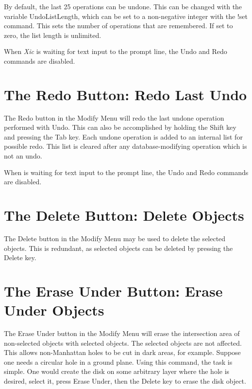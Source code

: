 By default, the last 25 operations can be undone.  This can be changed
with the variable {\et UndoListLength}, which can be set to a
non-negative integer with the {\cb !set} command.  This sets the
number of operations that are remembered.  If set to zero, the list
length is unlimited.

When {\it Xic} is waiting for text input to the prompt line, the {\cb
Undo} and {\cb Redo} commands are disabled.


\section{The {\cb Redo} Button: Redo Last Undo}
The {\cb Redo} button in the {\cb Modify Menu} will redo the last
undone operation performed with {\cb Undo}.  This can also be
accomplished by holding the {\kb Shift} key and pressing the {\kb Tab}
key.  Each undone operation is added to an internal list for possible
redo.  This list is cleared after any database-modifying operation
which is not an undo.

When {\Xic} is waiting for text input to the prompt line, the {\cb
Undo} and {\cb Redo} commands are disabled.


\section{The {\cb Delete} Button: Delete Objects}
The {\cb Delete} button in the {\cb Modify Menu} may be used to delete
the selected objects.  This is redundant, as selected objects can be
deleted by pressing the {\kb Delete} key.


\section{The {\cb Erase Under} Button: Erase Under Objects}
The {\cb Erase Under} button in the {\cb Modify Menu} will erase the
intersection area of non-selected objects with selected objects.  The
selected objects are not affected.  This allows non-Manhattan holes to
be cut in dark areas, for example.  Suppose one needs a circular hole
in a ground plane.  Using this command, the task is simple.  One would
create the disk on some arbitrary layer where the hole is desired,
select it, press {\cb Erase Under}, then the {\kb Delete} key to erase
the disk object.


